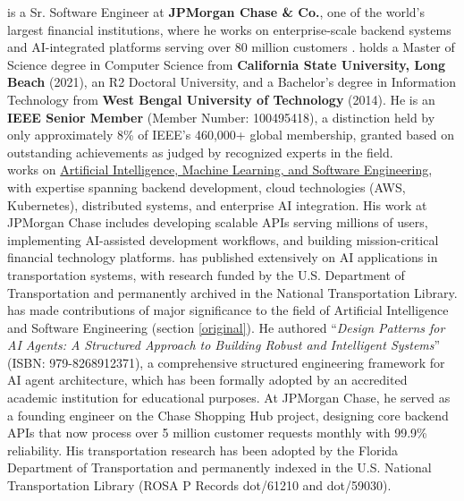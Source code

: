 \documentclass[11pt]{article}
\begin{document}
\dr is a Sr. Software Engineer at \textbf{JPMorgan Chase \& Co.}, one of the world's largest financial institutions, where he works on enterprise-scale backend systems and AI-integrated platforms serving over 80 million customers \cite{cv}. \dr holds a Master of Science degree in Computer Science from \textbf{California State University, Long Beach} (2021), an R2 Doctoral University, and a Bachelor's degree in Information Technology from \textbf{West Bengal University of Technology} (2014). He is an \textbf{IEEE Senior Member} (Member Number: 100495418), a distinction held by only approximately 8\% of IEEE's 460,000+ global membership, granted based on outstanding achievements as judged by recognized experts in the field.\\

\dr works on \underline{Artificial Intelligence, Machine Learning, and Software Engineering}, with expertise spanning backend development, cloud technologies (AWS, Kubernetes), distributed systems, and enterprise AI integration. His work at JPMorgan Chase includes developing scalable APIs serving millions of users, implementing AI-assisted development workflows, and building mission-critical financial technology platforms. \dr has published extensively on AI applications in transportation systems, with research funded by the U.S. Department of Transportation and permanently archived in the National Transportation Library.\\


\dr has made contributions of major significance to the field of Artificial Intelligence and Software Engineering (section \ref{original}). He authored ``\emph{Design Patterns for AI Agents: A Structured Approach to Building Robust and Intelligent Systems}'' (ISBN: 979-8268912371), a comprehensive structured engineering framework for AI agent architecture, which has been formally adopted by an accredited academic institution for educational purposes. At JPMorgan Chase, he served as a founding engineer on the Chase Shopping Hub project, designing core backend APIs that now process over 5 million customer requests monthly with 99.9\% reliability. His transportation research has been adopted by the Florida Department of Transportation and permanently indexed in the U.S. National Transportation Library (ROSA P Records dot/61210 and dot/59030).\\
\end{document}

